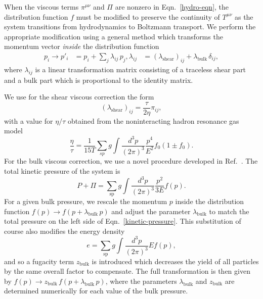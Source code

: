 \documentclass[aps,prc,reprint,amsmath,nofootinbib]{revtex4-1}
\def\\#1{ #1}
\begin{document}
When the viscous terms $\pi^{\mu\nu}$ and $\Pi$ are nonzero in Eqn.~\eqref{hydro-eqn}, the distribution function $f$ must be modified to preserve the continuity of $T^{\mu\nu}$ as the system transitions from hydrodynamics to Boltzmann transport.
We perform the appropriate modification using a general method which transforms the momentum vector \emph{inside} the distribution function \cite{Pratt:2010jt}
\begin{align}
  \label{viscous_correction}
  p_i \rightarrow p'_i &= p_i + \sum\limits_j \lambda_{ij}\, p_j,\\
  \lambda_{ij} &= (\lambda_\mathrm{shear})_{ij} + \lambda_\mathrm{bulk}\, \delta_{ij},
\end{align}
where $\lambda_{ij}$ is a linear transformation matrix consisting of a traceless shear part and a bulk part which is proportional to the identity matrix.

We use for the shear viscous correction the form \cite{Pratt:2010jt}
\begin{equation}
  (\lambda_\mathrm{shear})_{ij} = \frac{\tau}{2 \eta} \pi_{ij},
\end{equation}
with a value for $\eta/\tau$ obtained from the noninteracting hadron resonance gas model
\begin{equation}
  \frac{\eta}{\tau} = \frac{1}{15 T} \sum\limits_{sp} g \int \frac{d^3p}{(2\pi)^3}\frac{p^4}{E^2} f_0 (1 \pm f_0).
\end{equation}
For the bulk viscous correction, we use a novel procedure developed in Ref.~\cite{Bernhard:2018hnz}.
The total kinetic pressure of the system is
\begin{equation}
  \label{kinetic-pressure}
  P + \Pi = \sum\limits_\mathrm{sp} g \int \frac{d^3p}{(2\pi)^3} \frac{p^2}{3E} f(p).
\end{equation}
For a given bulk pressure, we rescale the momentum $p$ inside the distribution function $f(p) \rightarrow f(p + \lambda_\mathrm{bulk}\, p)$ and adjust the parameter $\lambda_\mathrm{bulk}$ to match the total pressure on the left side of Eqn.~\eqref{kinetic-pressure}.
This substitution of course also modifies the energy density
\begin{equation}
  e = \sum\limits_\mathrm{sp} g \int \frac{d^3p}{(2 \pi)^3} E f(p),
\end{equation}
and so a fugacity term $z_\mathrm{bulk}$ is introduced which decreases the yield of all particles by the same overall factor to compensate.
The full transformation is then given by $f(p) \rightarrow z_\mathrm{bulk}\, f(p + \lambda_\mathrm{bulk}\, p)$, where the parameters $\lambda_\mathrm{bulk}$ and $z_\mathrm{bulk}$ are determined numerically for each value of the bulk pressure.
\end{document}
